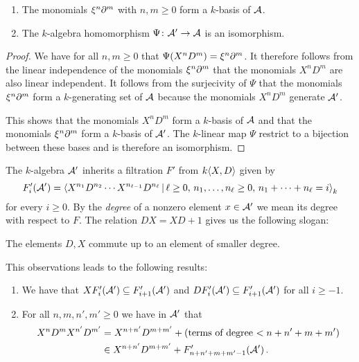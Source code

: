 \begin{corollary}
  \leavevmode
  \begin{enumerate}
    \item
      The monomials $\xi^n \partial^m$ with $n, m \geq 0$ form a $k$-basis of $\mathcal{A}$.
    \item
      The $k$-algebra homomorphism $\Psi \colon \mathcal{A}' \to \mathcal{A}$ is an isomorphism.
  \end{enumerate}
\end{corollary}


\begin{proof}
  We have for all $n, m \geq 0$ that $\Psi(X^n D^m) = \xi^n \partial^m$.
  It therefore follows from the linear independence of the monomials $\xi^n \partial^m$ that the monomials $X^n D^m$ are also linear independent.
  It follows from the surjecivity of $\Psi$ that the monomials $\xi^n \partial^m$ form a $k$-generating set of $\mathcal{A}$ because the monomials $X^n D^m$ generate $\mathcal{A}'$.
  
  This shows that the monomials $X^n D^m$ form a $k$-basis of $\mathcal{A}$ and that the monomials $\xi^n \partial^m$ form a $k$-basis of $\mathcal{A}'$.
  The $k$-linear map $\Psi$ restrict to a bijection between these bases and is therefore an isomorphism.
\end{proof}


\begin{fluff}
  The $k$-algebra $\mathcal{A}'$ inherits a filtration $F'$ from $k\!\left\langle X,D \right\rangle$ given by
  \begin{equation}
    \label{equation: filtration of Weyl via quotient}
      F'_i(\mc{A}')
    = \gen{
        X^{n_1} D^{n_2} \dotsm X^{n_{\ell-1}} D^{n_\ell}
      \suchthat
        \ell \geq 0, \,
        n_1, \dotsc, n_\ell \geq 0, \,
        n_1 + \dotsb + n_\ell = i
      }_k
  \end{equation}
  for every $i \geq 0$.
  By the \emph{degree} of a nonzero element $x \in \mathcal{A}'$ we mean its degree with respect to $F$.  
  The relation $D X = X D + 1$ gives us the following slogan:
  \begin{center}
    The elements $D, X$ commute up to an element of smaller degree.
  \end{center}
  This observations leads to the following results:
\end{fluff}


\begin{lemma}
  \label{lemma: two monomonial commute up to smaller degree}
  \leavevmode
  \begin{enumerate}
    \item
      We have that $X F'_i(\mathcal{A}') \subseteq F'_{i+1}(\mathcal{A}')$ and $D F'_i(\mathcal{A}') \subseteq F'_{i+1}(\mathcal{A}')$ for all $i \geq -1$.
    \item
      For all $n, m, n', m' \geq 0$ we have in $\mathcal{A}'$ that
      \begin{align*}
              X^n D^m X^{n'} D^{m'}
        &=    X^{n+n'} D^{m+m'} + (\text{terms of degree $< n+n'+m+m'$})  \\
        &\in  X^{n+n'} D^{m+m'} + F'_{n+n'+m+m'-1}(\mathcal{A}') \,.
      \end{align*}
  \end{enumerate}
\end{lemma}


